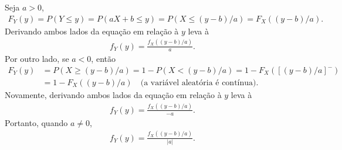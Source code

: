 \begin{questions}
\begin{solution}
	Seja $a>0$,
	\begin{align*}
		F_Y(y) = P(Y\le y) = P(aX+b\le y) = P(X\le (y-b)/a) = F_X((y-b)/a).
	\end{align*}
    Derivando ambos lados da equação em relação à $y$ leva à
    \begin{align*}
    	f_Y(y) = \frac{f_X((y-b)/a)}{a}.
    \end{align*}
    Por outro lado, se $a<0$, então
    \begin{align*}
    	F_Y(y) &= P(X\ge (y-b)/a) = 1-P(X<(y-b)/a) = 1-F_X([(y-b)/a]^-)\\
        	&= 1-F_X((y-b)/a) \quad\text{(a variável aleatória é contínua).}
    \end{align*}
    Novamente, derivando ambos lados da equação em relação à $y$ leva à
    \begin{align*}
    	f_Y(y) = \frac{f_X((y-b)/a)}{-a}.
    \end{align*}
    Portanto, quando $a\neq 0$,
    \begin{align*}
    	f_Y(y) = \frac{f_X((y-b)/a)}{|a|}.
    \end{align*}
\end{solution}

\end{questions}